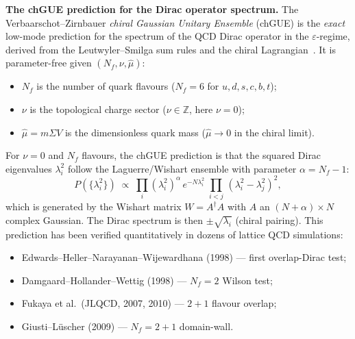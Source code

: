 \documentclass[11pt,a4paper]{article}
\theoremstyle{plain}
\theoremstyle{definition}
\theoremstyle{remark}
\begin{document}
\medskip\noindent
\textbf{The chGUE prediction for the Dirac operator spectrum.}
The Verbaarschot--Zirnbauer \emph{chiral Gaussian Unitary Ensemble}
(chGUE) is the \emph{exact} low-mode prediction for the spectrum
of the QCD Dirac operator in the $\varepsilon$-regime, derived
from the Leutwyler--Smilga sum rules and the chiral
Lagrangian~\cite{verbaarschot1991,leutwyler-smilga1992}.  It is
parameter-free given $(N_f, \nu, \hat\mu)$:
\begin{itemize}[leftmargin=1.6em,itemsep=2pt]
  \item $N_f$ is the number of quark flavours ($N_f = 6$ for
        $u, d, s, c, b, t$);
  \item $\nu$ is the topological charge sector ($\nu \in \mathbb Z$,
        here $\nu = 0$);
  \item $\hat\mu = m \Sigma V$ is the dimensionless quark mass
        ($\hat\mu \to 0$ in the chiral limit).
\end{itemize}
For $\nu = 0$ and $N_f$ flavours, the chGUE prediction is that
the squared Dirac eigenvalues $\lambda_i^2$ follow the
Laguerre/Wishart ensemble with parameter $\alpha = N_f - 1$:
\begin{equation}
  P(\{\lambda_i^2\}) \;\propto\;
  \prod_i (\lambda_i^2)^{\alpha}\, e^{-N\lambda_i^2}
  \;\prod_{i<j}\, (\lambda_i^2 - \lambda_j^2)^2,
\end{equation}
which is generated by the Wishart matrix $W = A^\dagger A$ with
$A$ an $(N + \alpha) \times N$ complex Gaussian.  The Dirac
spectrum is then $\pm\sqrt{\lambda_i}$ (chiral pairing).  This
prediction has been verified quantitatively in dozens of lattice
QCD simulations:
\begin{itemize}[leftmargin=1.6em,itemsep=2pt]
  \item Edwards--Heller--Narayanan--Wijewardhana (1998) --- first
        overlap-Dirac test;
  \item Damgaard--Hollander--Wettig (1998) --- $N_f = 2$ Wilson
        test;
  \item Fukaya et al.\ (JLQCD, 2007, 2010) --- $2+1$ flavour
        overlap;
  \item Giusti--Lüscher (2009) --- $N_f = 2+1$ domain-wall.
\end{itemize}
\end{document}

